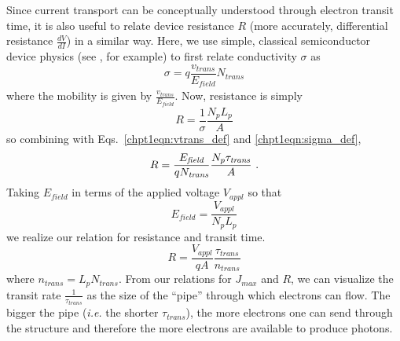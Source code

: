 {Since current transport can be conceptually understood through electron transit time, it is also useful to relate device resistance $R$ (more accurately, differential resistance $\frac{d V}{d\!I}$) in a similar way.  Here, we use simple, classical semiconductor device physics (see \cite{Sze}, for example) to first relate conductivity $\sigma$ as
\begin{equation}
\label{chpt1eqn:sigma_def}
\sigma = q  \frac{v_\textit{trans}}{E_\textit{field}} N_\textit{trans}
\end{equation}
where the mobility is given by $\frac{v_\textit{trans}}{E_\textit{field}}$.  Now, resistance is simply
\begin{equation}
R = \frac{1}{\sigma} \frac{N_p L_p}{A}
\end{equation}
so combining with Eqs.~\eqref{chpt1eqn:vtrans_def} and \eqref{chpt1eqn:sigma_def},
\begin{equation}
R = \frac{E_\textit{field}}{q N_\textit{trans}} \frac{N_p \tau_\textit{trans}}{A} \textnormal{~.}
\end{equation}
Taking $E_\textit{field}$ in terms of the applied voltage $V_\textit{appl}$ so that
\begin{equation}
E_\textit{field} = \frac{V_\textit{appl}}{N_p L_p}
\end{equation}
we realize our relation for resistance and transit time.
\begin{equation}
R = \frac{V_\textit{appl}}{q A} \frac{\tau_\textit{trans}}{n_\textit{trans}}
\end{equation}
where $n_\textit{trans}=L_p N_\textit{trans}$.  From our relations for $J_{max}$ and $R$, we can visualize the transit rate $\frac{1}{\tau_\textit{trans}}$ as the size of the ``pipe'' through which electrons can flow.  The bigger the pipe (\emph{i.e.} the shorter $\tau_\textit{trans}$), the more electrons one can send through the structure and therefore the more electrons are available to produce photons.





}
